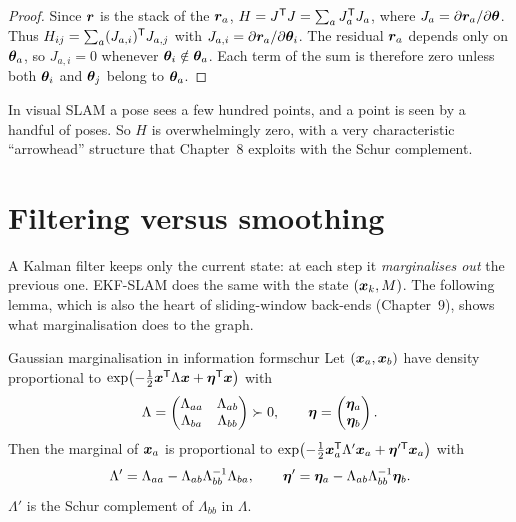 \begin{proof}
Since $\bm{r}$ is the stack of the $\bm{r}_a$,
$H=J^{\mathsf{T}} J=\sum_{a}J_a^{\mathsf{T}} J_a$, where $J_a=\partial\bm{r}_a/\partial\bm{\theta}$.
Thus $H_{ij}=\sum_a (J_{a,i})^{\mathsf{T}} J_{a,j}$ with
$J_{a,i}=\partial\bm{r}_a/\partial\bm{\theta}_i$. The residual
$\bm{r}_a$ depends only on $\bm{\theta}_a$, so $J_{a,i}=0$ whenever
$\bm{\theta}_i\notin\bm{\theta}_a$. Each term of the sum is therefore zero unless
both $\bm{\theta}_i$ and $\bm{\theta}_j$ belong to $\bm{\theta}_a$.
\end{proof}

\begin{inwords}
In visual SLAM a pose sees a few hundred points, and a point is seen by a
handful of poses. So $H$ is overwhelmingly zero, with a very characteristic
``arrowhead'' structure that Chapter~8 exploits with the Schur complement.
\end{inwords}

\section{Filtering versus smoothing}

A Kalman filter keeps only the current state: at each step it
\emph{marginalises out} the previous one. EKF-SLAM does the same with the
state $(\bm{x}_k,M)$. The following lemma, which is also the heart of
sliding-window back-ends (Chapter~9), shows what marginalisation does to
the graph.

\begin{lemma}{Gaussian marginalisation in information form}{schur}
Let $(\bm{x}_a,\bm{x}_b)$ have density proportional to
$\exp\bigl(-\tfrac12\bm{x}^{\mathsf{T}}\Lambda\bm{x}+\bm{\eta}^{\mathsf{T}}\bm{x}\bigr)$ with
\[
  \Lambda=\begin{pmatrix}\Lambda_{aa}&\Lambda_{ab}\\
    \Lambda_{ba}&\Lambda_{bb}\end{pmatrix}\succ0,\qquad
  \bm{\eta}=\begin{pmatrix}\bm{\eta}_a\\\bm{\eta}_b\end{pmatrix}.
\]
Then the marginal of $\bm{x}_a$ is proportional to
$\exp\bigl(-\tfrac12\bm{x}_a^{\mathsf{T}}\Lambda'\bm{x}_a+\bm{\eta}'^{\mathsf T}\bm{x}_a\bigr)$
with
\begin{equation}\label{eq:schur}
\Lambda'=\Lambda_{aa}-\Lambda_{ab}\Lambda_{bb}^{-1}\Lambda_{ba},\qquad
\bm{\eta}'=\bm{\eta}_a-\Lambda_{ab}\Lambda_{bb}^{-1}\bm{\eta}_b .
\end{equation}
$\Lambda'$ is the Schur complement of $\Lambda_{bb}$ in $\Lambda$.
\end{lemma}

